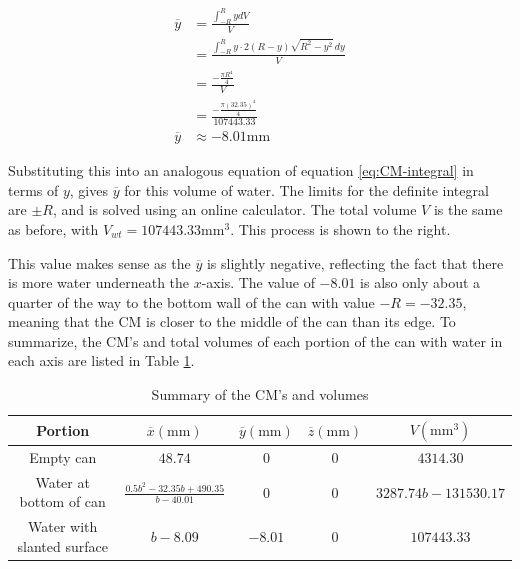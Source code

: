 \documentclass[11pt]{article}
\begin{document}
    \begin{figure}
        \vspace{-20pt}
        {\footnotesize\begin{align*}
            \overline{y} &= \frac{\int_{-R}^R y dV}{V} \\
            &= \frac{\int_{-R}^R y \cdot 2 (R - y) \sqrt{R^2 - y^2} \, dy}{V} \\
            &= \frac{-\frac{\pi R^4}{4}}{V} \\
            &= \frac{-\frac{\pi (32.35)^4}{4}}{107443.33} \\
            \overline{y} &\approx -8.01 \mathrm{mm}
        \end{align*}}
    \end{figure}

    Substituting this into an analogous equation of equation \eqref{eq:CM-integral} in terms of $y$, gives $\overline{y}$ for this volume of water. The limits for the definite integral are $\pm R$, and is solved using an online calculator. The total volume $V$ is the same as before, with ${V_{wt} = 107443.33 \mathrm{mm}^3}$. This process is shown to the right.

    This value makes sense as the $\overline{y}$ is slightly negative, reflecting the fact that there is more water underneath the $x$-axis. The value of $-8.01$ is also only about a quarter of the way to the bottom wall of the can with value $-R = -32.35$, meaning that the CM is closer to the middle of the can than its edge. To summarize, the CM's and total volumes of each portion of the can with water in each axis are listed in Table \ref{tab:cm-summary}.

    \begin{table}[H]
        \scriptsize
        \renewcommand{\arraystretch}{0.9}
        \centering
        \caption{Summary of the CM's and volumes}
        \vspace{-8pt}
        \begin{tabular}{|c|c|c|c|c|}
            \hline
            Portion & $\overline{x} (\mathrm{mm})$ & $\overline{y} (\mathrm{mm})$ & $\overline{z} (\mathrm{mm})$ & $V (\mathrm{mm}^3)$ \\
            \hline \hline
            Empty can & $48.74$ & $0$ & $0$ & $4314.30$ \\
            \hline
            Water at bottom of can & $\frac{0.5b^2 - 32.35b + 490.35}{b - 40.01}$ & $0$ & $0$ & $3287.74b - 131530.17$ \\
            \hline
            Water with slanted surface & $b - 8.09$ & $-8.01$ & $0$ & $107443.33$ \\
            \hline
        \end{tabular}
        \label{tab:cm-summary}
    \end{table}
    \vspace{-10pt}
\end{document}
